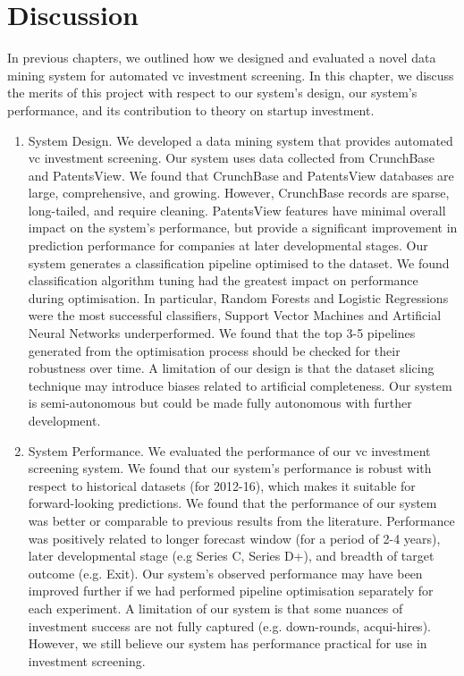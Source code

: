 \documentclass[../thesis/thesis.tex]{subfiles}
\begin{document}
\chapter{Discussion}
\label{chap:discussion}

In previous chapters, we outlined how we designed and evaluated a novel data mining system for automated \gls{vc} investment screening. In this chapter, we discuss the merits of this project with respect to our system's design, our system's performance, and its contribution to theory on startup investment.

\begin{enumerate}

\item System Design. We developed a data mining system that provides automated \gls{vc} investment screening. Our system uses data collected from CrunchBase and PatentsView. We found that CrunchBase and PatentsView databases are large, comprehensive, and growing. However, CrunchBase records are sparse, long-tailed, and require cleaning. PatentsView features have minimal overall impact on the system's performance, but provide a significant improvement in prediction performance for companies at later developmental stages. Our system generates a classification pipeline optimised to the dataset. We found classification algorithm tuning had the greatest impact on performance during optimisation. In particular, Random Forests and Logistic Regressions were the most successful classifiers, Support Vector Machines and Artificial Neural Networks underperformed. We found that the top 3-5 pipelines generated from the optimisation process should be checked for their robustness over time. A limitation of our design is that the dataset slicing technique may introduce biases related to artificial completeness. Our system is semi-autonomous but could be made fully autonomous with further development.

\item System Performance. We evaluated the performance of our \gls{vc} investment screening system. We found that our system's performance is robust with respect to historical datasets (for 2012-16), which makes it suitable for forward-looking predictions. We found that the performance of our system was better or comparable to previous results from the literature. Performance was positively related to longer forecast window (for a period of 2-4 years), later developmental stage (e.g Series C, Series D+), and breadth of target outcome (e.g. Exit). Our system's observed performance may have been improved further if we had performed pipeline optimisation separately for each experiment. A limitation of our system is that some nuances of investment success are not fully captured (e.g. down-rounds, acqui-hires). However, we still believe our system has performance practical for use in investment screening.


\end{enumerate}
\end{document}
